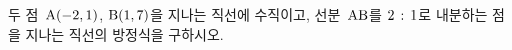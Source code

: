 두 점~$\mathrm{A}(-2{,}\mkern3mu\mathopen{}1)$, $\mathrm{B}(1{,}\mkern3mu\mathopen{}7)$을 지나는 직선에 수직이고, 선분~$\mathrm{AB}$를 $2\mkern3mu :\mkern3mu 1$로 내분하는 점을 지나는 직선의 방정식을 구하시오.
